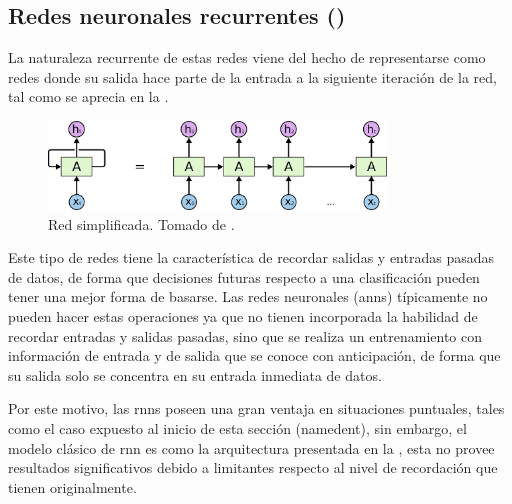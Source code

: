 \subsection{Redes neuronales recurrentes ()}
La naturaleza recurrente de estas redes viene del hecho de representarse como redes donde su salida hace parte de la entrada a la siguiente iteración de la red, tal como se aprecia en la .

\begin{figure}[H]
  \centering
  \includegraphics[width=0.8\textwidth]{Figures/RNN-unrolled.png}
\decoRule
\caption[Red  simplificada]{Red  simplificada. Tomado de \cite{understanding-lstm}.}
\label{fig:rnn-classic-simple}
\end{figure}

Este tipo de redes tiene la característica de recordar salidas y entradas pasadas de datos, de forma que decisiones futuras respecto a una clasificación pueden tener una mejor forma de basarse. Las redes neuronales (\glspl{ann}) típicamente no pueden hacer estas operaciones ya que no tienen incorporada la habilidad de recordar entradas y salidas pasadas, sino que se realiza un entrenamiento con información de entrada y de salida que se conoce con anticipación, de forma que su salida solo se concentra en su entrada inmediata de datos.

Por este motivo, las \glspl{rnn} poseen una gran ventaja en situaciones puntuales, tales como el caso expuesto al inicio de esta sección (\gls{namedent}), sin embargo, el modelo clásico de \gls{rnn} es como la arquitectura presentada en la , esta no provee resultados significativos debido a limitantes respecto al nivel de recordación que tienen originalmente.


